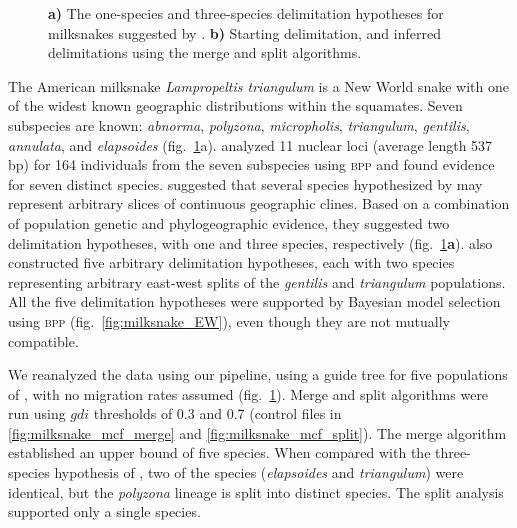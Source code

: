 \documentclass{article1}
\newcommand{\blue}[1]{{\color{blue}{#1}}}
\begin{document}
\begin{figure}[t]
    \caption{\textbf{a)} The one-species and three-species delimitation hypotheses for
    milksnakes suggested by \citet{Chambers2020}.
    \textbf{b)} Starting delimitation, and inferred delimitations using the merge and
    split algorithms. \blue{[Updated figure to use custom image. Updated colours to match between geographic distributions, and the phylogenetic trees.]} %
} \label{fig:milksnake}
\end{figure} 

The American milksnake \textit{Lampropeltis triangulum} is a New World snake with one of
the widest known geographic distributions within the squamates.  Seven subspecies are
known: \textit{abnorma}, \textit{polyzona}, \textit{micropholis}, \textit{triangulum},
\textit{gentilis}, \textit{annulata}, and \textit{elapsoides} (fig.~\ref{fig:milksnake}a).
\citet{Ruane2014} analyzed 11 nuclear loci (average length 537 bp) for 164 individuals
from the seven subspecies using \textsc{bpp} and found evidence for seven distinct
species.  \citet{Chambers2020} suggested that several species hypothesized by
\citet{Ruane2014} may represent arbitrary slices of continuous geographic clines.  Based
on a combination of population genetic and phylogeographic evidence, they suggested two
delimitation hypotheses, with one and three species, respectively
(fig.~\ref{fig:milksnake}\textbf{a}).  \citet{Chambers2020} also constructed five
arbitrary delimitation hypotheses, each with two species representing arbitrary east-west
splits of the \textit{gentilis} and \textit{triangulum} populations.  All the five
delimitation hypotheses were supported by Bayesian model selection using \textsc{bpp}
(fig.~\ref{fig:milksnake_EW}), even though they are not mutually compatible.

We reanalyzed the data using our pipeline, using a guide tree for five populations of
\citet{Chambers2020}, with no migration rates assumed (fig.~\ref{fig:milksnake}).  Merge
and split algorithms were run using $gdi$ thresholds of 0.3 and 0.7 (control files
in \ref{fig:milksnake_mcf_merge} and \ref{fig:milksnake_mcf_split}).  The merge algorithm
established an upper bound of five species.  When compared with the three-species
hypothesis of \citet{Chambers2020}, two of the species (\textit{elapsoides} and
\textit{triangulum}) were identical, but the \textit{polyzona} lineage is split into
distinct species.  The split analysis supported only a single species.
\end{document}

